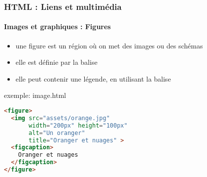 \documentclass[xcolor=table]{beamer}
\begin{document}
\begin{frame}[fragile]
\frametitle{HTML : Liens et multimédia}
\framesubtitle{Images et graphiques : Figures}

\begin{minipage}{0.47\textwidth} 
	\begin{itemize}
		\item une figure est un région où on met des images ou des schémas 
		\item elle est définie par la balise 
		\item elle peut contenir une légende, en utilisant la balise 
	\end{itemize}
\end{minipage}
%
\begin{minipage}{0.52\textwidth}
\begin{exampleblock}{exemple: image.html}
\lstset{escapeinside=**}
\scriptsize\bfseries\vspace{-6pt}
\begin{lstlisting}[language={html}]
<figure>
  <img src="assets/orange.jpg"
       width="200px" height="100px"
       alt="Un oranger" 
       title="Oranger et nuages" >
  <figcaption>
    Oranger et nuages
  </figcaption>
</figure>
\end{lstlisting}\vspace{-6pt}
\end{exampleblock}
\end{minipage}

\end{frame}
\end{document}
